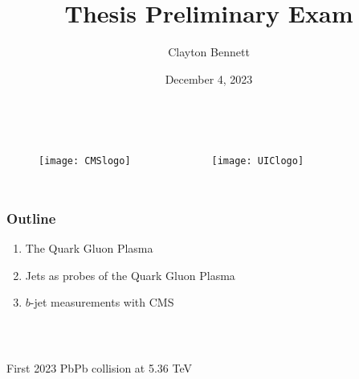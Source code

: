 \documentclass[9pt]{beamer}
\title[Thesis Preliminary Exam] %
      {\textbf{Thesis Preliminary Exam}}
\author[Clayton Bennett] %
       {Clayton Bennett}
\institute[UIC] %
{
               
  University of Illinois at Chicago \\
  The CMS Collaboration
  
}
\date[4 Dec 2023] %
     {December 4, 2023}
\begin{document}
     \graphicspath{ {/home/clayton/Documents/nuclear/GroupMeeting/figures} }

     \begin{frame}
       \titlepage
       \begin{columns}
	 \centering
	 \begin{figure}
	   \texttt{[image: CMSlogo]}
	 \end{figure}
	 
	 \begin{figure}
	   \texttt{[image: UIClogo]}
	 \end{figure}
       \end{columns}
     \end{frame}

     \graphicspath{ {/home/clayton/Documents/nuclear/thesisPrelim/figures} }

     \begin{frame}
       \frametitle{\textbf{Outline}}
       \begin{enumerate}
       \item \label{th1} The Quark Gluon Plasma
       \item \label{th2} Jets as probes of the Quark Gluon Plasma
       \item \label{th3} $b$-jet measurements with CMS
       \end{enumerate}

       \

       \begin{columns}
       \end{columns}
       \centering \scriptsize First 2023 PbPb collision at 5.36 TeV
     \end{frame}
\end{document}
